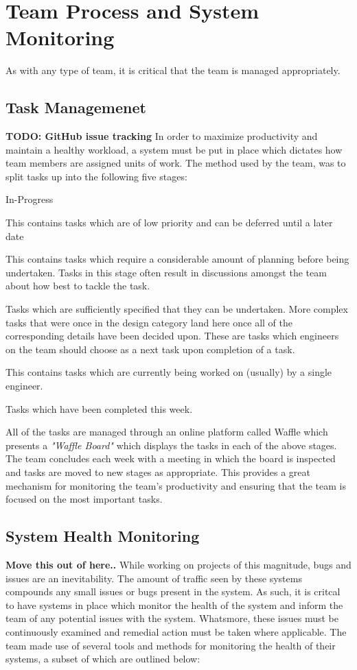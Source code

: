 \chapter{Team Process and System Monitoring}
As with any type of team, it is critical that the team is managed appropriately.  

\section{Task Managemenet}
\textbf{TODO: GitHub issue tracking}
In order to maximize productivity and maintain a healthy workload, a system must be put in place which dictates how team members are assigned units of work. The method used by the \team{} team, was to split tasks up into the following five stages:

\begin{labeling}{In-Progress}
	\item [Backlog] This contains tasks which are of low priority and can be deferred until a later date
	\item [Design] This contains tasks which require a considerable amount of planning before being undertaken. Tasks in this stage often result in discussions amongst the team about how best to tackle the task.
	\item [Ready] Tasks which are sufficiently specified that they can be undertaken. More complex tasks that were once in the design category land here once all of the corresponding details have been decided upon. These are tasks which engineers on the team should choose as a next task upon completion of a task.
	\item [In-Progress] This contains tasks which are currently being worked on (usually) by a single engineer.
	\item [Completed] Tasks which have been completed this week.
\end{labeling}

All of the tasks are managed through an online platform called Waffle\cite{waffle} which presents a \textit{"Waffle Board"} which displays the tasks in each of the above stages. The team concludes each week with a meeting in which the board is inspected and tasks are moved to new stages as appropriate. This provides a great mechanism for monitoring the team's productivity and ensuring that the team is focused on the most important tasks. 

\section{System Health Monitoring}
\textbf{Move this out of here..}
While working on projects of this magnitude, bugs and issues are an inevitability. The amount of traffic seen by these systems compounds any small issues or bugs present in the system. As such, it is critcal to have systems in place which monitor the health of the system and inform the team of any potential issues with the system. Whatsmore, these issues must be continuously examined and remedial action must be taken where applicable. The \team{} team made use of several tools and methods for monitoring the health of their systems, a subset of which are outlined below:

